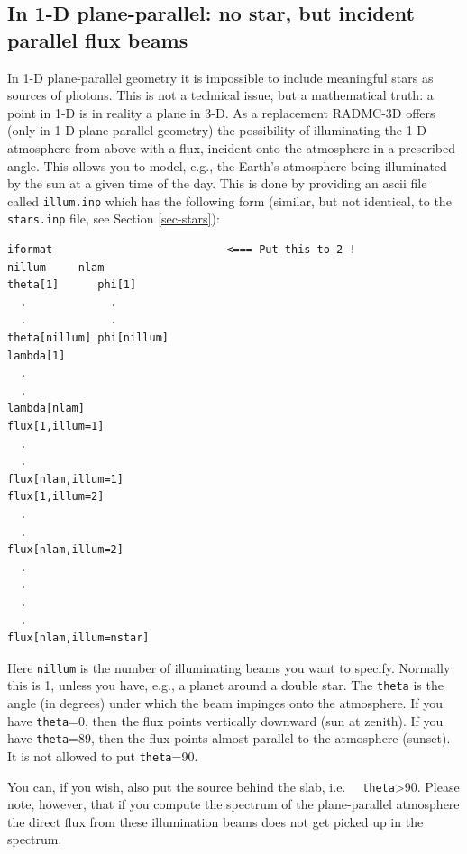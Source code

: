 \documentclass{report}
\newenvironment{asciibox}%
  {\begin{list}{}{%
    \setlength{\topsep}{0.5em}%
    \setlength{\parskip}{0em}%
    \setlength{\parsep}{0em}%
    \setlength{\itemsep}{0em}%
    \setlength{\rightmargin}{0em}%
    \setlength{\leftmargin}{3.0em}%
    \setlength{\labelsep}{1em}%
    \setlength{\labelwidth}{2em}%
  }\normalfont\footnotesize\item}
  {\end{list}}
\begin{document}
\subsection{In 1-D plane-parallel: no star, but incident parallel flux beams}
In 1-D plane-parallel geometry it is impossible to include meaningful stars
as sources of photons. This is not a technical issue, but a mathematical
truth: a point in 1-D is in reality a plane in 3-D. As a replacement
RADMC-3D offers (only in 1-D plane-parallel geometry) the possibility of
illuminating the 1-D atmosphere from above with a flux, incident onto the
atmosphere in a prescribed angle. This allows you to model, e.g., the
Earth's atmosphere being illuminated by the sun at a given time of the day.
This is done by providing an ascii file called {\small\tt illum.inp} which 
has the following form (similar, but not identical, to the
{\small\tt stars.inp} file, see Section \ref{sec-stars}):
\begin{asciibox}\begin{verbatim}
iformat                           <=== Put this to 2 !
nillum     nlam
theta[1]      phi[1]
  .             .        
  .             .        
theta[nillum] phi[nillum]
lambda[1]
  .
  .
lambda[nlam]
flux[1,illum=1]
  .
  .
flux[nlam,illum=1]
flux[1,illum=2]
  .
  .
flux[nlam,illum=2]
  .
  .
  .
  .
flux[nlam,illum=nstar]
\end{verbatim}\end{asciibox}
Here {\small\tt nillum} is the number of illuminating beams you want to
specify. Normally this is 1, unless you have, e.g., a planet around a double
star. The {\small\tt theta} is the angle (in degrees) under which the beam
impinges onto the atmosphere. If you have {\small\tt theta}=0, then the flux
points vertically downward (sun at zenith). If you have {\small\tt theta}=89,
then the flux points almost parallel to the atmosphere (sunset). It is
not allowed to put {\small\tt theta}=90. 

You can, if you wish, also put the source behind the slab, i.e.~ {\small\tt
  theta}>90. Please note, however, that if you compute the spectrum of the
plane-parallel atmosphere
the direct flux
from these illumination beams does not get picked up in the spectrum.
\end{document}

